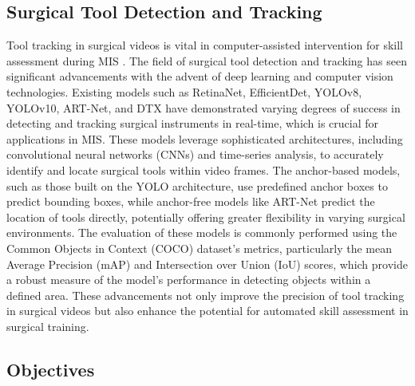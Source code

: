 
\subsection{Surgical Tool Detection and Tracking}


Tool tracking in surgical videos is vital in computer-assisted intervention for skill assessment during MIS \cite{nwoye_cholectrack20_2023}. The field of surgical tool detection and tracking has seen significant advancements with the advent of deep learning and computer vision technologies. Existing models such as RetinaNet, EfficientDet, YOLOv8, YOLOv10, ART-Net, and DTX have demonstrated varying degrees of success in detecting and tracking surgical instruments in real-time, which is crucial for applications in MIS. These models leverage sophisticated architectures, including convolutional neural networks (CNNs) and time-series analysis, to accurately identify and locate surgical tools within video frames. The anchor-based models, such as those built on the YOLO architecture, use predefined anchor boxes to predict bounding boxes, while anchor-free models like ART-Net predict the location of tools directly, potentially offering greater flexibility in varying surgical environments. The evaluation of these models is commonly performed using the Common Objects in Context (COCO) dataset's metrics, particularly the mean Average Precision (mAP) and Intersection over Union (IoU) scores, which provide a robust measure of the model's performance in detecting objects within a defined area. These advancements not only improve the precision of tool tracking in surgical videos but also enhance the potential for automated skill assessment in surgical training.

\subsection{Objectives}

